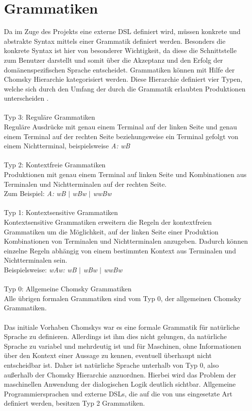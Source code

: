 \documentclass[11pt,a4paper,bibtotocnumbered]{scrreprt}
\begin{document}
\section{Grammatiken} 
Da im Zuge des Projekts eine externe DSL definiert wird, müssen konkrete und abstrakte Syntax mittels einer Grammatik definiert werden. Besonders die konkrete Syntax ist hier von besonderer Wichtigkeit, da diese die Schnittstelle zum Benutzer darstellt und somit über die Akzeptanz und den Erfolg der domänenspezifischen Sprache entscheidet.
Grammatiken können mit Hilfe der Chomsky Hierarchie kategorisiert werden. Diese Hierarchie definiert vier Typen, welche sich durch den Umfang der durch die Grammatik erlaubten Produktionen unterscheiden \cite{Chomsky}.
\\
\\
Typ 3: Reguläre Grammatiken\\
Reguläre Ausdrücke mit genau einem Terminal auf der linken Seite und genau einem Terminal auf der rechten Seite beziehungsweise ein Terminal gefolgt von einem Nichtterminal, beispielsweise \emph{A: wB}
\\
\\
Typ 2: Kontextfreie Grammatiken\\
Produktionen mit genau einem Terminal auf linken Seite und Kombinationen aus Terminalen und Nichtterminalen auf der rechten Seite. \\Zum Beispiel: \emph{A: wB $\vert$ wBw $\vert$ wwBw}
\\
\\
Typ 1: Kontextsensitive Grammatiken\\
Kontextsensitive Grammatiken erweitern die Regeln der kontextfreien Grammatiken um die Möglichkeit, auf der linken Seite einer Produktion Kombinationen von Terminalen und Nichtterminalen anzugeben. Dadurch können einzelne Regeln abhängig von einem bestimmten Kontext aus Terminalen und Nichtterminalen sein. \\Beispielsweise: \emph{wAw: wB $\vert$ wBw $\vert$ wwBw}
\\
\\
Typ 0: Allgemeine Chomsky Grammatiken\\
Alle übrigen formalen Grammatiken sind vom Typ 0, der allgemeinen Chomsky Grammatiken.
\\
\\
Das initiale Vorhaben Chomskys war es eine formale Grammatik für natürliche Sprache zu definieren. Allerdings ist ihm dies nicht gelungen, da natürliche Sprache zu variabel und mehrdeutig ist und für Maschinen, ohne Informationen über den Kontext einer Aussage zu kennen, eventuell überhaupt nicht entscheidbar ist. Daher ist natürliche Sprache unterhalb von Typ 0, also außerhalb der Chomsky Hierarchie anzuordnen. Hierbei wird das Problem der maschinellen Anwendung der dialogischen Logik deutlich sichtbar. Allgemeine Programmiersprachen und externe DSLs, die auf die von uns eingesetzte Art definiert werden, besitzen Typ 2 Grammatiken.
\end{document}
